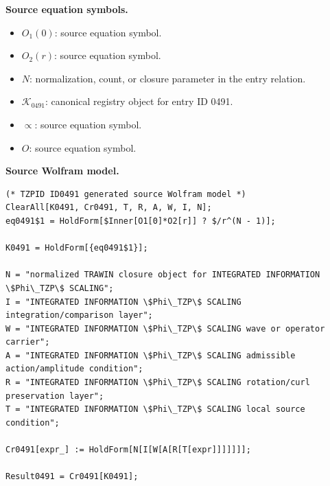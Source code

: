 \begin{minipage}[t]{0.49\linewidth}
\begingroup
\small
\raggedright
\textbf{Source equation symbols.}\par
\begin{itemize}[leftmargin=1.35em,itemsep=1pt,topsep=1pt,parsep=0pt]
    \item $O_1(0)$: source equation symbol.
    \item $O_2(r)$: source equation symbol.
    \item $N$: normalization, count, or closure parameter in the entry relation.
    \item $\mathcal{K}_{0491}$: canonical registry object for entry ID 0491.
    \item $\propto$: source equation symbol.
    \item $O$: source equation symbol.
\end{itemize}
\endgroup
\end{minipage}\hfill
\begin{minipage}[t]{0.47\linewidth}
\begingroup
\scriptsize
\raggedright
\textbf{Source Wolfram model.}\par
\begin{Verbatim}[fontsize=\tiny,breaklines=true,breakanywhere=true]
(* TZPID ID0491 generated source Wolfram model *)
ClearAll[K0491, Cr0491, T, R, A, W, I, N];
eq0491$1 = HoldForm[$Inner[O1[0]*O2[r]] ? $/r^(N - 1)];

K0491 = HoldForm[{eq0491$1}];

N = "normalized TRAWIN closure object for INTEGRATED INFORMATION \$Phi\_TZP\$ SCALING";
I = "INTEGRATED INFORMATION \$Phi\_TZP\$ SCALING integration/comparison layer";
W = "INTEGRATED INFORMATION \$Phi\_TZP\$ SCALING wave or operator carrier";
A = "INTEGRATED INFORMATION \$Phi\_TZP\$ SCALING admissible action/amplitude condition";
R = "INTEGRATED INFORMATION \$Phi\_TZP\$ SCALING rotation/curl preservation layer";
T = "INTEGRATED INFORMATION \$Phi\_TZP\$ SCALING local source condition";

Cr0491[expr_] := HoldForm[N[I[W[A[R[T[expr]]]]]]];

Result0491 = Cr0491[K0491];
\end{Verbatim}
\endgroup
\end{minipage}

